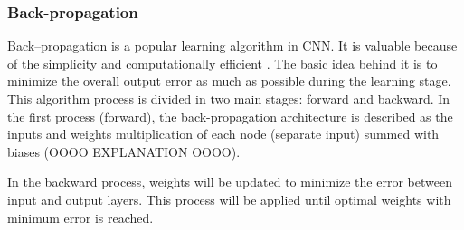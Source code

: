 \subsubsection{Back-propagation}
Back–propagation is a popular learning algorithm in CNN. It is valuable because of the simplicity and computationally efficient \citep{Bengio2012}.
The basic idea behind it is to minimize the overall output error as much as possible during the learning stage. This algorithm process is divided in two main stages: forward and backward. In the first process (forward), the back-propagation architecture is described as  the inputs and weights multiplication of each node (separate input) summed with biases (OOOO EXPLANATION OOOO).\citep{Hameed2016} 

In the backward process, weights will be updated to minimize the error between input and output layers.
This process will be applied until optimal weights with minimum error is reached.\citep{Hameed2016}


